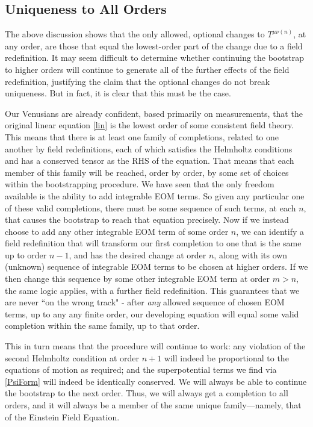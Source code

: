 \documentclass[aps,physrev,preprint,groupedaddress]{revtex4-2}
\begin{document}
\subsection{Uniqueness to All Orders}
The above discussion shows that the only allowed, optional changes to \(T^{\mu\nu(n)}\), at any order, are those that equal the lowest-order part of the change due to a field redefinition. It may seem difficult to determine whether continuing the bootstrap to higher orders will continue to generate all of the further effects of the field redefinition, justifying the claim that the optional changes do not break uniqueness. But in fact, it is clear that this must be the case.

Our Venusians are already confident, based primarily on measurements, that the original linear equation \eqref{lin} is the lowest order of some consistent field theory. This means that there is at least one family of completions, related to one another by field redefinitions, each of which satisfies the Helmholtz conditions and has a conserved tensor as the RHS of the equation. That means that each member of this family will be reached, order by order, by some set of choices within the bootstrapping procedure. We have seen that the only freedom available is the ability to add integrable EOM terms. So given any particular one of these valid completions, there must be some sequence of such terms, at each \(n\), that causes the bootstrap to reach that equation precisely. Now if we instead choose to add any other integrable EOM term of some order \(n\), we can identify a field redefinition that will transform our first completion to one that is the same up to order \(n-1\), and has the desired change at order \(n\), along with its own (unknown) sequence of integrable EOM terms to be chosen at higher orders. If we then change this sequence by some other integrable EOM term at order \(m>n\), the same logic applies, with a further field redefinition. This guarantees that we are never ``on the wrong track" - after \textit{any} allowed sequence of chosen EOM terms, up to any any finite order, our developing equation will equal some valid completion within the same family, up to that order. 

This in turn means that the procedure will continue to work: any violation of the second Helmholtz condition at order \(n+1\) will indeed be proportional to the equations of motion as required; and the superpotential terms we find via \eqref{PsiForm} will indeed be identically conserved. We will always be able to continue the bootstrap to the next order. Thus, we will always get a completion to all orders, and it will always be a member of the same unique family—namely, that of the Einstein Field Equation.
\end{document}
